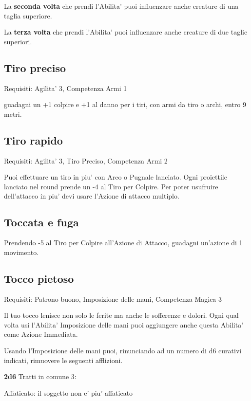 \documentclass[a4paper,11pt,twoside,openany]{book}
\begin{document}
La \textbf{seconda volta} che prendi l'Abilita' puoi influenzare anche creature di una taglia superiore.

La \textbf{terza volta} che prendi l'Abilita' puoi influenzare anche creature di due taglie superiori.

\subsection{Tiro preciso}

Requisiti: Agilita' 3, Competenza Armi 1

guadagni un +1 colpire e +1 al danno per i tiri, con armi da tiro o archi, entro 9 metri.

\subsection{Tiro rapido}

Requisiti: Agilita' 3, Tiro Preciso, Competenza Armi 2

Puoi effettuare un tiro in piu' con Arco o Pugnale lanciato. Ogni
proiettile lanciato nel round prende un -4 al Tiro per Colpire. Per
poter usufruire dell'attacco in piu' devi usare l'Azione di attacco
multiplo.

\subsection{Toccata e fuga}

Prendendo -5 al Tiro per Colpire all'Azione di Attacco, guadagni un'azione di 1 movimento.

\subsection{Tocco pietoso}

Requisiti: Patrono buono, Imposizione delle mani, Competenza Magica 3

Il tuo tocco lenisce non solo le ferite ma anche le sofferenze e dolori. Ogni qual volta usi l'Abilita' Imposizione delle mani puoi aggiungere anche questa Abilita' come Azione Immediata.

Usando l'Imposizione delle mani puoi, rinunciando ad un numero di d6 curativi indicati, rimuovere le seguenti afflizioni.

\textbf{2d6} Tratti in comune 3:

Affaticato: il soggetto non e' piu' affaticato
\end{document}
